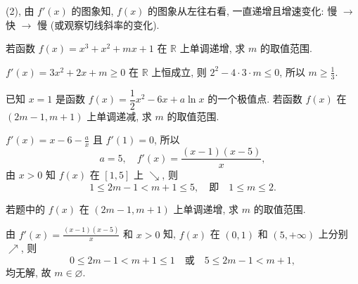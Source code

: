   \beginsolution
    (2), 由 $f'(x)$ 的图象知, $f(x)$ 的图象从左往右看, 一直递增且增速变化: 慢 $\to$ 快 $\to$ 慢 (或观察切线斜率的变化).
  \endsolution
  
  \begin{exercise}
    若函数 $f(x)=x^3 +x^2 +mx+1$ 在 $\mathbb{R}$ 上单调递增, 
    求 $m$ 的取值范围.
  \end{exercise}

  \beginsolution
    $f'(x)=3x^2+2x+m\geqslant 0$ 在 $\mathbb{R}$ 上恒成立, 则 $2^2-4\cdot 3\cdot m\leqslant 0$, 所以 $m\geqslant \frac13$.
  \endsolution
  
  \begin{exercise}
    已知 $x=1$ 是函数 $f(x)=\dfrac12 x^2 -6x+a\ln x$ 的一个极值点.
    若函数 $f(x)$ 在 $(2m-1,m+1)$ 上单调递减, 求 $m$ 的取值范围.
  \end{exercise}
  
  \beginsolution
    $f'(x)= x-6-\frac{a}x$ 且 $f'(1)=0$, 所以 
    \[a=5,\quad f'(x)=\frac{(x-1)(x-5)}x,\]
    由 $x>0$ 知 $f(x)$ 在 $[1,5]$ 上 $\searrow$, 则 \[1\leqslant 2m-1< m+1\leqslant 5,\quad \text{即}\quad 1\leqslant m\leqslant 2.\]
    
    \varexercise 若题中的 $f(x)$ 在 $(2m-1,m+1)$ 上单调递增, 求 $m$ 的取值范围.
    
    由 $f'(x)=\frac{(x-1)(x-5)}x$ 和 $x>0$ 知, $f(x)$ 在 $(0,1)$ 和 $(5,+\infty)$ 上分别 $\nearrow$, 则
    \[0\leqslant 2m-1< m+1\leqslant 1\quad\text{或}\quad 5\leqslant 2m-1< m+1,\]
    均无解, 故 $m\in\varnothing$.
  \endsolution
  
